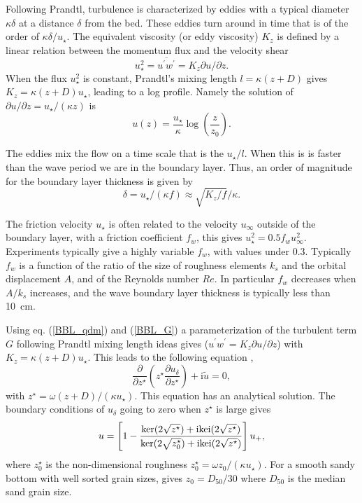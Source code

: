 Following Prandtl, turbulence is characterized by eddies with a typical diameter $\kappa \delta$ at a distance 
$\delta$ from the bed.  These eddies turn around in time that is 
of the order of $\kappa \delta / u_\star$. The equivalent viscosity (or eddy viscosity)  $K_z$ is defined by a linear relation between 
the momentum flux and the velocity shear
\begin{equation}
u_\star^2=\overline{u^\prime w^\prime}= K_z
\partial u/ \partial z.
\end{equation}
When the  flux  $u_\star^2$ is constant, Prandtl's mixing length $l= \kappa (z+D)$ gives $K_z = \kappa (z+D) u_\star$, leading to
a log profile. Namely the solution of $\partial u/
\partial z = u_\star / (\kappa z)$ is 
\begin{equation}
u(z)=\frac{u_\star}{\kappa} \log\left(\frac{z}{z_0}\right).
\end{equation}

The eddies mix the flow on a time scale that is the $u_\star / l$. When this is is faster than the wave period we are in the boundary layer. 
Thus, an order of magnitude for the boundary layer thickness is given by 
\begin{equation}
              \delta=u_\star / (\kappa f) \approx
\sqrt{K_z/f}/\kappa.                                                            
\end{equation}

The friction velocity $u_\star$ is often related to the velocity $u_\infty$  outside of the boundary layer, with a friction coefficient
$f_w$, this gives  $u_\star^2=0.5 f_w u_\infty^2$. 
Experiments typically give a highly variable $f_w$, with values under 0.3. Typically  $f_w$ is a function of the ratio of the size of roughness elements 
$k_s$ and the orbital displacement $A$, and of the Reynolds number 
$Re$. In particular  $f_w$ decreases when  $A/k_s$ increases, and the wave boundary layer thickness is typically less than 10~cm.

Using eq. (\ref{BBL_qdm}) and (\ref{BBL_G}) a parameterization of the turbulent term $G$ following Prandtl mixing length ideas gives 
($u^\prime w^\prime = K_z
\partial u/
\partial z$) with $K_z = \kappa (z+D) u_\star$. This leads to the following equation \citep{Kajiura1968,Grant&Madsen1979},
\begin{equation}
\frac{\partial }{\partial z^\star} \left(z^\star \frac{\partial
u_\delta}{\partial z^\star}\right) + {\mathrm i} \widetilde{u} = 0,
\end{equation}
with $z^\star=\omega (z+D) / (\kappa u_\star)$.  This equation has an analytical solution. The boundary conditions of  $u_\delta$ going to zero when 
$z^\star$ is large gives 
\begin{equation}
u=\left[1-\frac{\ker (2\sqrt{z^\star}) + {\mathrm i} {\rm kei}
(2\sqrt{z^\star})}{\ker  (2\sqrt{z^\star_0})+  {\mathrm i} {\rm kei}
(2\sqrt{z^\star})} \right] u_+,
\end{equation}
where  $z^\star_0$ is the non-dimensional roughness  $z^\star_0=\omega
z_0 / (\kappa u_\star)$. For a smooth sandy bottom with well sorted grain sizes, 
\cite{Nikuradse1933} gives  $z_0=D_{50}/30$ where $D_{50}$ is the median sand grain size.


